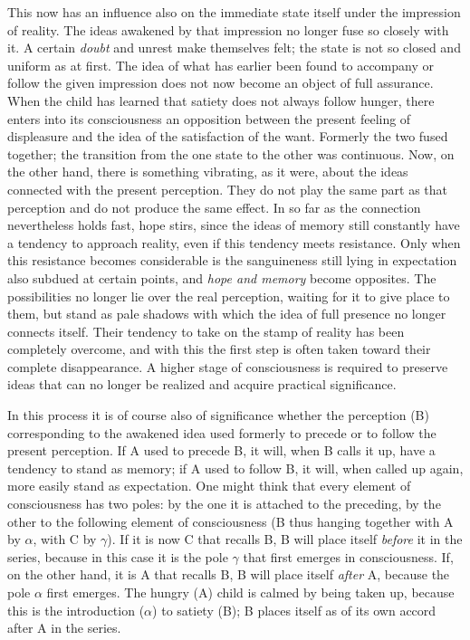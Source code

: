 \documentclass[12pt,a4paper]{book}
\newcommand{\opage}[1]{\marginnote{\footnotesize\textit{[#1]}}}
\begin{document}
This now has an influence also on the immediate state itself under the
impression of reality. The ideas awakened by that impression no longer
fuse so closely with it. A certain \emph{doubt} and unrest make
themselves felt; the state is not so closed and uniform as at first. The
idea of what has earlier been found to accompany or follow the given
impression does not now become an object of full assurance. When the child
has learned that satiety does not always follow hunger, there enters into
its consciousness an opposition between the present feeling of
displeasure and the idea of the satisfaction of the want. Formerly the
two fused together; the transition from the one state to the other was
continuous. Now, on the other hand, there is something vibrating, as it
were, about the ideas connected with the present perception. They do not
play the same part as that perception and do not produce the same effect.
In so far as the connection nevertheless holds fast, hope stirs, since the
ideas of memory still constantly have a tendency to approach reality, even
if this tendency meets resistance. Only when this resistance becomes
considerable is the sanguineness still lying in expectation also subdued
at certain points, and \emph{hope and memory} become opposites. The
possibilities no longer lie over the real perception, waiting for it to
give place to them, but stand as pale shadows with which
\opage{163}the idea of full presence no longer connects itself. Their
tendency to take on the stamp of reality has been completely overcome, and
with this the first step is often taken toward their complete
disappearance. A higher stage of consciousness is required to preserve
ideas that can no longer be realized and acquire practical significance.

In this process it is of course also of significance whether the
perception (B) corresponding to the awakened idea used formerly to precede
or to follow the present perception. If A used to precede B, it will,
when B calls it up, have a tendency to stand as memory; if A used to
follow B, it will, when called up again, more easily stand as expectation.
One might think that every element of consciousness has two poles: by the
one it is attached to the preceding, by the other to the following element
of consciousness (B thus hanging together with A by $\alpha$, with C by
$\gamma$). If it is now C that recalls B, B will place itself \emph{before}
it in the series, because in this case it is the pole $\gamma$ that first
emerges in consciousness. If, on the other hand, it is A that recalls B, B
will place itself \emph{after} A, because the pole $\alpha$ first emerges.
The hungry (A) child is calmed by being taken up, because this is the
introduction ($\alpha$) to satiety (B); B places itself as of its own
accord after A in the series.
\end{document}
